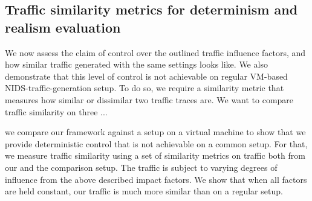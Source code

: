 \documentclass[sigconf]{acmart}
\begin{document}
\subsection{Traffic similarity metrics for determinism and realism evaluation}

We now assess the claim of control over the outlined traffic influence factors, and how similar traffic generated with the same settings looks like. We also demonstrate that this level of control is not achievable on regular VM-based NIDS-traffic-generation setup.
To do so, we require a similarity metric that measures how similar or dissimilar two traffic traces are. We want to compare traffic similarity on three ...

we compare our framework against a setup on a virtual machine to show that we provide deterministic control that is not achievable on a common setup. For that, we measure traffic similarity using a set of similarity metrics on traffic both from our and the comparison setup. The traffic is subject to varying degrees of influence from the above described impact factors. We show that when all factors are held constant, our traffic is much more similar than on a regular setup.


\end{document}
